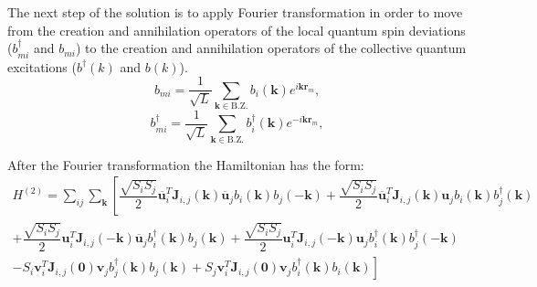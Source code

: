 \documentclass[a4paper,12pt]{article}
\begin{document}
        The next step of the solution is to apply Fourier transformation in order to move from the creation and annihilation operators 
        of the local quantum spin deviations ($b^{\dag}_{mi}$ and $b_{mi}$) 
        to the creation and annihilation operators of the collective quantum excitations ($b^{\dag}(k)$ and $b(k)$).
        \begin{equation}
            b_{mi} = \dfrac{1}{\sqrt{L}}\sum_{\boldsymbol{k} \in \text{B.Z.}} b_i(\boldsymbol{k})e^{i\boldsymbol{k}\boldsymbol{r}_m},
        \end{equation}
        \begin{equation}
            b^{\dag}_{mi} = \dfrac{1}{\sqrt{L}}\sum_{\boldsymbol{k} \in \text{B.Z.}} b^{\dag}_i(\boldsymbol{k})e^{-i\boldsymbol{k}\boldsymbol{r}_m},
        \end{equation}

        After the Fourier transformation the Hamiltonian has the form:
        \begin{multline}
            H^{(2)} = \sum_{ij}\sum_{\boldsymbol{k}}\left[\dfrac{\sqrt{S_i S_j}}{2}\overline{\boldsymbol{u}}^T_i\boldsymbol{J}_{i,j}(\boldsymbol{k})\overline{\boldsymbol{u}}_jb_{i}(\boldsymbol{k})b_{j}(-\boldsymbol{k}) +
            \dfrac{\sqrt{S_i S_j}}{2} \overline{\boldsymbol{u}}^T_i\boldsymbol{J}_{i,j}(\boldsymbol{k})\boldsymbol{u}_j b_{i}(\boldsymbol{k})b^{\dag}_{j}(\boldsymbol{k})\right. \\+ 
            \dfrac{\sqrt{S_i S_j}}{2}\boldsymbol{u}^T_i\boldsymbol{J}_{i,j}(-\boldsymbol{k})\overline{\boldsymbol{u}}_jb^{\dag}_{i}(\boldsymbol{k})b_{j}(\boldsymbol{k}) +
            \dfrac{\sqrt{S_i S_j}}{2}\boldsymbol{u}^T_i\boldsymbol{J}_{i,j}(-\boldsymbol{k})\boldsymbol{u}_jb^{\dag}_{i}(\boldsymbol{k})b^{\dag}_{j}(-\boldsymbol{k}) \\-
            \left.S_i\boldsymbol{v}^T_i\boldsymbol{J}_{i,j}(\boldsymbol{0})\boldsymbol{v}_jb^{\dag}_{j}(\boldsymbol{k})b_{j}(\boldsymbol{k}) + 
            S_j\boldsymbol{v}^T_i\boldsymbol{J}_{i,j}(\boldsymbol{0})\boldsymbol{v}_jb^{\dag}_{i}(\boldsymbol{k})b_{i}(\boldsymbol{k})\right]
        \end{multline}
\end{document}
